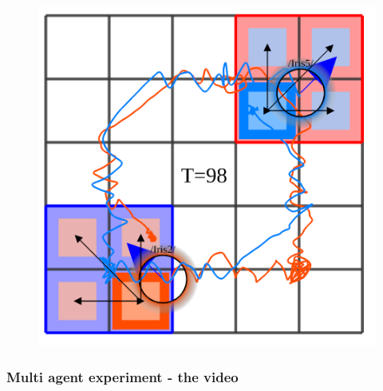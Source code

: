 \documentclass{beamer}
\begin{document}
\begin{frame}
\begin{figure}
\begin{minipage}{0.3\textwidth}
    \includegraphics[width=\linewidth]{multi_ltl/multi12}
  \end{minipage} 
\end{figure}
\end{frame}


\begin{frame}
\frametitle{Multi agent experiment - the video}
\end{frame}

\end{document}
